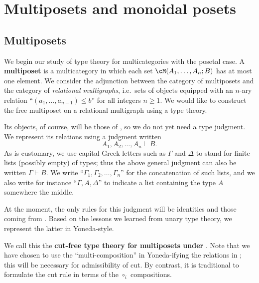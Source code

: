 \documentclass{book}
\let\types\vdash
\begin{document}
\section{Multiposets and monoidal posets}
\label{sec:multiposets-monpos}

\subsection{Multiposets}
\label{sec:multiposets}

We begin our study of type theory for multicategories with the posetal case.
A \textbf{multiposet} is a multicategory in which each set $\cM(A_1,\dots,A_n;B)$ has at most one element.
We consider the adjunction between the category \bMPos of multiposets and the category \bRelMGr of \emph{relational multigraphs}, i.e.\ sets of objects equipped with an $n$-ary relation ``$(a_1,\dots,a_{n-1})\le b$'' for all integers $n\ge 1$.
We would like to construct the free multiposet on a relational multigraph \cG using a type theory.

Its objects, of course, will be those of \cG, so we do not yet need a type judgment.
We represent its relations using a judgment written
\[A_1,A_2,\dots,A_n \types B.\]
As is customary, we use capital Greek letters such as $\Gamma$ and $\Delta$ to stand for finite lists (possibly empty) of types; thus the above general judgment can also be written $\Gamma\types B$.
We write ``$\Gamma_1,\Gamma_2,\dots,\Gamma_n$'' for the concatenation of such lists, and we also write for instance ``$\Gamma,A,\Delta$'' to indicate a list containing the type $A$ somewhere the middle.

At the moment, the only rules for this judgment will be identities and those coming from \cG.
Based on the lessons we learned from unary type theory, we represent the latter in Yoneda-style.
We call this the \textbf{cut-free type theory for multiposets under \cG}.
Note that we have chosen to use the ``multi-composition'' in Yoneda-ifying the relations in \cG; this will be necessary for admissibility of cut.
By contrast, it is traditional to formulate the cut rule in terms of the $\circ_i$ compositions.
\end{document}
